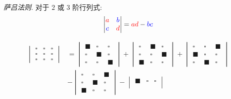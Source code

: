 \documentclass[UTF8]{ctexart}
\theoremstyle{remark}
\newenvironment{concept}[1]
{\hspace{1em} #1. \hspace{0.5em}}
{\vspace{0.5em}}
\begin{document}
\begin{framed}
    \begin{concept}{\textit{萨吕法则}}
        对于 $ 2 $ 或 $ 3 $ 阶行列式:
        \[ 
        \begin{vmatrix}
            {\color{red} a} & {\color{blue} b} \\
            {\color{blue} c} & {\color{red} d}
        \end{vmatrix} = {\color{red} ad} - {\color{blue} bc}    
        \]

        \begin{align*}
            \begin{vmatrix} 
                \square & \square & \square \\
                \square & \square & \square \\
                \square & \square & \square
            \end{vmatrix}
            &= 
            \begin{vmatrix} 
                \blacksquare & \square & \square \\
                \square & \blacksquare & \square \\
                \square & \square & \blacksquare
            \end{vmatrix} + 
            \begin{vmatrix} 
                \square & \blacksquare & \square \\
                \square & \square & \blacksquare \\
                \blacksquare & \square & \square
            \end{vmatrix} +
            \begin{vmatrix} 
                \square & \square & \blacksquare \\
                \blacksquare & \square & \square \\
                \square & \blacksquare & \square
            \end{vmatrix} \\
            &-
            \begin{vmatrix} 
                \square & \square & \blacksquare \\
                \square & \blacksquare & \square \\
                \blacksquare & \square & \square
            \end{vmatrix} -
            \begin{vmatrix} 
                \blacksquare & \square & \square \\

\end{vmatrix}
\end{align*}
\end{concept}
\end{framed}
\end{document}
